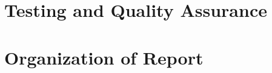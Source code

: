 

\section{Testing and Quality Assurance}
\label{sec:intro-testing-qa}


\section{Organization of Report}

